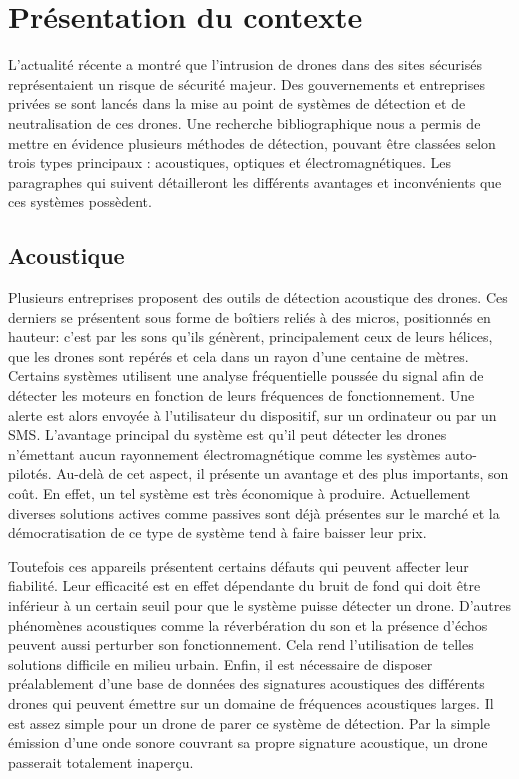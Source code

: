 

\chapter{Présentation du contexte}

L'actualité récente a montré que l'intrusion de drones dans des sites sécurisés représentaient un risque de sécurité majeur. Des gouvernements et entreprises privées se sont lancés dans la mise au point de systèmes de détection et de neutralisation de ces drones. Une recherche bibliographique nous a permis de mettre en évidence plusieurs méthodes de détection, pouvant être classées selon trois types principaux : acoustiques, optiques et électromagnétiques.  
Les paragraphes qui suivent détailleront les différents avantages et inconvénients que ces systèmes possèdent.

\section{Acoustique}

Plusieurs entreprises proposent des outils de détection acoustique des drones. Ces derniers se présentent sous forme de boîtiers reliés à des micros, positionnés en hauteur: c'est par les sons qu'ils génèrent, principalement ceux de leurs hélices, que les drones sont repérés et cela dans un rayon d'une centaine de mètres. Certains systèmes utilisent une analyse fréquentielle poussée du signal afin de détecter les moteurs en fonction de leurs fréquences de fonctionnement. Une alerte est alors envoyée à l'utilisateur du dispositif, sur un ordinateur ou par un SMS. L'avantage principal du système est qu'il peut détecter les drones n'émettant aucun rayonnement électromagnétique comme les systèmes auto-pilotés. Au-delà de cet aspect, il présente un avantage et des plus importants, son coût. En effet, un tel système est très économique à produire. Actuellement diverses solutions actives comme passives sont déjà présentes sur le marché et la démocratisation de ce type de système tend à faire baisser leur prix.

Toutefois ces appareils présentent certains défauts qui peuvent affecter leur fiabilité. Leur efficacité est en effet dépendante du bruit de fond qui doit être inférieur à un certain seuil pour que le système puisse détecter un drone. D'autres phénomènes acoustiques comme la réverbération du son et la présence d'échos peuvent aussi perturber son fonctionnement. Cela rend l'utilisation de telles solutions difficile en milieu urbain. Enfin, il est nécessaire de disposer préalablement d'une base de données des signatures acoustiques des différents drones qui peuvent émettre sur un domaine de fréquences acoustiques larges. Il est assez simple pour un drone de parer ce système de détection. Par la simple émission d'une onde sonore couvrant sa propre signature acoustique, un drone passerait totalement inaperçu.

